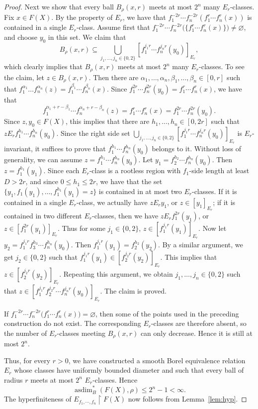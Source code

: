 \documentclass[11pt, reqno, a4paper]{amsart}
\theoremstyle{definition}
\theoremstyle{plain}
\begin{document}
\begin{proof}
Next we show that every ball $B_{\rho}(x,r)$ meets at most $2^n$ many $E_r$-classes. Fix $x\in F(X)$. By the property of $E_r$, we have that $f_1^{-2r}\cdots f_n^{-2r}(f_1^r\cdots f_n^r(x))$ is contained in a single $E_r$-class. Assume first that
$f_1^{-2r}\cdots f_n^{-2r}
\bigl(\{f_1^r\cdots f_n^r(x)\}\bigr)
\neq\varnothing$,
and choose $y_0$ in this set. We claim that
$$ B_{\rho}(x, r)\subseteq \bigcup_{j_1, \dots, j_n\in\{0,2\}} \left[f_1^{j_1r}\cdots f_n^{j_nr}(y_0)\right]_{E_r}, $$
which clearly implies that $B_{\rho}(x, r)$ meets at most $2^n$ many $E_r$-classes. To see the claim, let $z\in B_{\rho}(x, r)$. Then there are $\alpha_1,\dots, \alpha_n, \beta_1, \dots, \beta_n\in [0, r]$ such that $f_1^{\alpha_1}\dots f_n^{\alpha_n}(z)=f_1^{\beta_1}\cdots f_n^{\beta_n}(x)$. Since $f_1^{2r}\cdots f_n^{2r}(y_0)=f_1^r\cdots f_n^r(x)$, we have that 
$$ f_1^{\alpha_1+r-\beta_1}\cdots f_n^{\alpha_n+r-\beta_n}(z)=f_1^r\cdots f_n^r(x)=f_1^{2r}\cdots f_n^{2r}(y_0). $$
Since $z, y_0\in F(X)$, this implies that there are $h_1, \dots, h_n\in [0, 2r]$ such that $zE_rf_1^{h_1}\cdots f_n^{h_n}(y_0)$. Since the right side set $\bigcup_{j_1, \dots, j_n\in\{0,2\}} \left[f_1^{j_1r}\cdots f_n^{j_nr}(y_0)\right]_{E_r}$ is $E_r$-invariant, it suffices
to prove that
$f_1^{h_1}\cdots f_n^{h_n}(y_0)$
belongs to it.
Without loss of generality, we can assume $z=f_1^{h_1}\cdots f_n^{h_n}(y_0)$. 
Let $y_1=f_2^{h_2}\cdots f_n^{h_n}(y_0)$. Then $z=f_1^{h_1}(y_1)$. Since each $E_r$-class is a rootless region with $f_1$-side length at least $D>2r$, and since $0\leq h_1\leq 2r$, we have that the set $\{y_1, f_1(y_1), \dots, f_1^{h_1}(y_1)=z\}$ is contained in at most two $E_r$-classes. If it is contained in a single $E_r$-class, we actually have $zE_ry_1$, or $z\in [y_1]_{E_r}$; if it is contained in two different $E_r$-classes, then we have $zE_r f_1^{2r}(y_1)$, or $z\in [f_1^{2r}(y_1)]_{E_r}$. Thus for some $j_1\in\{0, 2\}$, $z\in [f_1^{j_1r}(y_1)]_{E_r}$. Now let $y_2=f_1^{j_1r}f_3^{h_3}\cdots f_n^{h_n}(y_0)$. Then $f_1^{j_1r}(y_1)=f_2^{h_2}(y_2)$. By a similar argument, we get $j_2\in\{0,2\}$ such that $f_1^{j_1r}(y_1)\in [f_2^{j_2r}(y_2)]_{E_r}$. This implies that $z\in [f_2^{j_2r}(y_2)]_{E_r}$. Repeating this argument, we obtain $j_1, \dots, j_n\in\{0,2\}$ such that $z\in [f_1^{j_1r}f_2^{j_2r}\cdots f_n^{j_nr}(y_0)]_{E_r}$. The claim is proved. 

If $f_1^{-2r}\cdots f_n^{-2r}
\bigl(f_1^r\cdots f_n^r(x)\bigr)
=\varnothing$, then some of the points used in the preceding construction do not
exist. The corresponding $E_r$-classes are therefore absent, so
the number of $E_r$-classes meeting $B_\rho(x,r)$ can only
decrease. Hence it is still at most $2^n$.

Thus, for every $r>0$, we have constructed a smooth Borel equivalence relation $E_r$ whose classes have uniformly bounded diameter and such that every ball of radius $r$ meets at most $2^n$ $E_r$-classes. Hence
$$
\operatorname{asdim}^*_B(F(X),\rho)\le 2^n-1<\infty.
$$
The hyperfiniteness of $E_{f_1,\cdots,f_n}\upharpoonright F(X)$ now follows from Lemma~\ref{lem:hyp}.
\end{proof}
\end{document}
